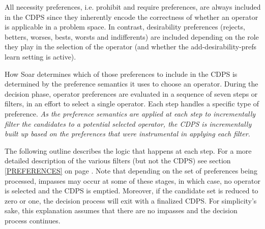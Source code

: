 All necessity preferences, i.e. prohibit and require preferences, are always
included in the CDPS since they inherently encode the correctness of whether an
operator is applicable in a problem space.  In contrast, desirability
preferences (rejects, betters, worses, bests, worsts and indifferents) are
included depending on the role they play in the selection of the operator (and
whether the add-desirability-prefs learn setting is active).

How Soar determines which of those preferences to include in the CDPS is determined by the preference semantics it uses to choose an operator.
During the decision phase, operator preferences are evaluated in a sequence of
seven steps or filters, in an effort to select a single operator. Each step
handles a specific type of preference.  \emph{As the preference semantics are applied
at each step to incrementally filter the candidates to a potential selected operator, the CDPS
is incrementally built up based on the preferences that were instrumental in applying each filter.}

The following outline describes the logic that happens at each step.  For a more
detailed description of the various filters (but not the CDPS) see section \ref{PREFERENCES} on page \pageref{PREFERENCES}.
Note that depending on the set of preferences being processed, impasses may occur at some
of these stages, in which case, no operator is selected and the CDPS is emptied.
 Moreover, if the candidate set is reduced to zero or one, the decision process
will exit with a finalized CDPS. For simplicity's sake, this explanation assumes
that there are no impasses and the decision process continues.


